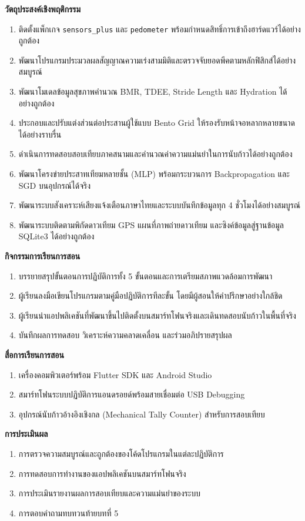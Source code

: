 \noindent\textbf{วัตถุประสงค์เชิงพฤติกรรม}
\begin{enumerate}
    \item ติดตั้งแพ็กเกจ \texttt{sensors\_plus} และ \texttt{pedometer} พร้อมกำหนดสิทธิ์การเข้าถึงฮาร์ดแวร์ได้อย่างถูกต้อง
    \item พัฒนาโปรแกรมประมวลผลสัญญาณความเร่งสามมิติและตรวจจับยอดพีคตามหลักฟิสิกส์ได้อย่างสมบูรณ์
    \item พัฒนาโมเดลข้อมูลสุขภาพคำนวณ BMR, TDEE, Stride Length และ Hydration ได้อย่างถูกต้อง
    \item ประกอบและปรับแต่งส่วนต่อประสานผู้ใช้แบบ Bento Grid ให้รองรับหน้าจอหลากหลายขนาดได้อย่างราบรื่น
    \item ดำเนินการทดสอบสอบเทียบภาคสนามและคำนวณค่าความแม่นยำในการนับก้าวได้อย่างถูกต้อง
    \item พัฒนาโครงข่ายประสาทเทียมหลายชั้น (MLP) พร้อมกระบวนการ Backpropagation และ SGD บนอุปกรณ์ได้จริง
    \item พัฒนาระบบสังเคราะห์เสียงแจ้งเตือนภาษาไทยและระบบบันทึกข้อมูลทุก 4 ชั่วโมงได้อย่างสมบูรณ์
    \item พัฒนาระบบติดตามพิกัดดาวเทียม GPS แผนที่ภาพถ่ายดาวเทียม และซิงค์ข้อมูลสู่ฐานข้อมูล SQLite3 ได้อย่างถูกต้อง
\end{enumerate}

\noindent\textbf{กิจกรรมการเรียนการสอน}
\begin{enumerate}
    \item บรรยายสรุปขั้นตอนการปฏิบัติการทั้ง 5 ขั้นตอนและการเตรียมสภาพแวดล้อมการพัฒนา
    \item ผู้เรียนลงมือเขียนโปรแกรมตามคู่มือปฏิบัติการทีละขั้น โดยมีผู้สอนให้คำปรึกษาอย่างใกล้ชิด
    \item ผู้เรียนนำแอปพลิเคชันที่พัฒนาขึ้นไปติดตั้งบนสมาร์ทโฟนจริงและเดินทดสอบนับก้าวในพื้นที่จริง
    \item บันทึกผลการทดสอบ วิเคราะห์ความคลาดเคลื่อน และร่วมอภิปรายสรุปผล
\end{enumerate}

\noindent\textbf{สื่อการเรียนการสอน}
\begin{enumerate}
    \item เครื่องคอมพิวเตอร์พร้อม Flutter SDK และ Android Studio
    \item สมาร์ทโฟนระบบปฏิบัติการแอนดรอยด์พร้อมสายเชื่อมต่อ USB Debugging
    \item อุปกรณ์นับก้าวอ้างอิงเชิงกล (Mechanical Tally Counter) สำหรับการสอบเทียบ
\end{enumerate}

\noindent\textbf{การประเมินผล}
\begin{enumerate}
    \item การตรวจความสมบูรณ์และถูกต้องของโค้ดโปรแกรมในแต่ละปฏิบัติการ
    \item การทดสอบการทำงานของแอปพลิเคชันบนสมาร์ทโฟนจริง
    \item การประเมินรายงานผลการสอบเทียบและความแม่นยำของระบบ
    \item การตอบคำถามทบทวนท้ายบทที่ 5
\end{enumerate}

